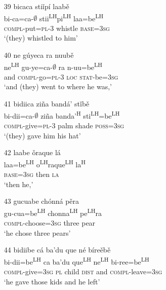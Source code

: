 \begin{itemize}
\item[39]
\glll bicaca sti\v{i}p\'{i} laab\v{e}\\
bi-ca=ca-$\emptyset$ stii\textsuperscript{LH}pi\textsuperscript{LH} laa=be\textsuperscript{LH}\\
\textsc{compl}-put=\textsc{pl}-\textsc{3} whistle \textsc{base}=\textsc{3sg}\\
\glt `(they) whistled to him'


\item[40]
\glll ne g\'{u}yeca ra nuub\v{e}\\
ne\textsuperscript{LH} gu-ye=ca-$\emptyset$ ra n-uu=be\textsuperscript{LH}\\
and \textsc{compl}-go=\textsc{pl}-\textsc{3} \textsc{loc} \textsc{stat}-be=\textsc{3sg}\\
\glt `and (they) went to where he was,'
 

\item[41]
\glll bidiica zi\~{n}a band\'{a}' st\v{i}b\v{e}\\
bi-dii=ca-$\emptyset$ zi\~{n}a banda'\textsuperscript{H} sti\textsuperscript{LH}=be\textsuperscript{LH}\\
\textsc{compl}-give=\textsc{pl}-\textsc{3} palm shade \textsc{poss}=\textsc{3sg}\\
\glt `(they) gave him his hat'


\item[42]
\glll laabe \v{o}raque l\'{a}\\
laa=be\textsuperscript{LH} o\textsuperscript{LH}raque\textsuperscript{LH} la\textsuperscript{H}\\
\textsc{base}=\textsc{3sg} then \textsc{la}\\
\glt `then he,'


\item[43]
\glll gucuabe ch\'{o}nn\'{a} p\v{e}ra\\
gu-cua=be\textsuperscript{LH} chonna\textsuperscript{LH} pe\textsuperscript{LH}ra\\
\textsc{compl}-choose=\textsc{3sg} three pear\\
\glt `he chose three pears'


\item[44]
\glll bidiibe c\'{a} ba'du que n\'{e} b\'{i}re\v{e}b\v{e}\\
bi-dii=be\textsuperscript{LH}  ca ba'du que\textsuperscript{LH}  ne\textsuperscript{LH}  bi-ree=be\textsuperscript{LH} \\
\textsc{compl}-give=\textsc{3sg} \textsc{pl} child \textsc{dist} and \textsc{compl}-leave=\textsc{3sg}\\
\glt `he gave those kids and he left'



\end{itemize}
